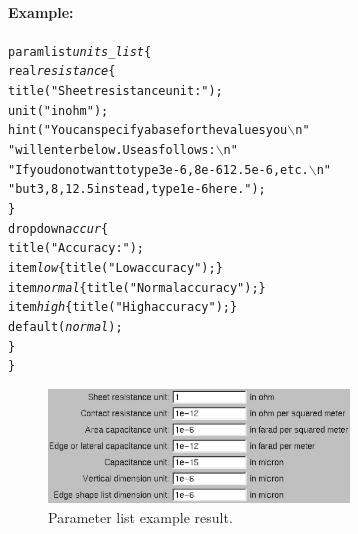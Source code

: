 
\paragraph{Example:}
\begin{alltt}
paramlist \emph{units_list} \{
    real \emph{resistance} \{
        title("Sheet resistance unit:");
        unit("in ohm");
        hint("You can specify a base for the values you \(\backslash\)n"
             "will enter below. Use as follows:\(\backslash\)n"
             "If you do not want to type 3e-6, 8e-6 12.5e-6, etc.\(\backslash\)n"
             "but 3, 8, 12.5 instead, type 1e-6 here.");
    \}
    dropdown \emph{accur} \{
        title("Accuracy:");
        item \emph{low} \{ title("Low accuracy"); \}
        item \emph{normal} \{ title("Normal accuracy"); \}
        item \emph{high} \{ title("High accuracy"); \}
        default(\emph{normal});
    \}
\}
\end{alltt}

\begin{figure}[h!] \begin{center}
\includegraphics[width=8cm]{./figures/ex_paramlist.eps}
\caption{Parameter list example result.}
\end{center} \end{figure}


